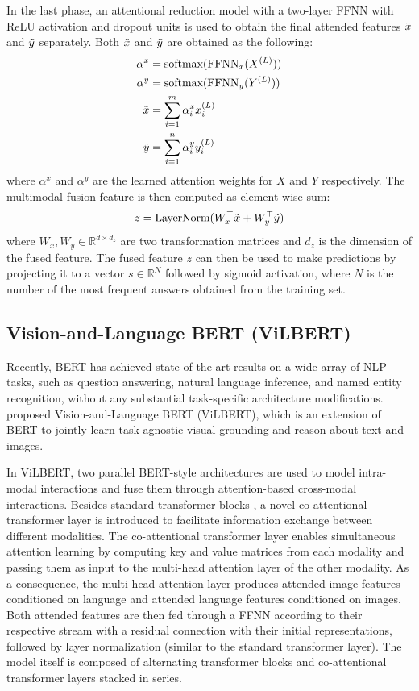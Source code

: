 \documentclass{article}
\begin{document}
In the last phase, an attentional reduction model with a two-layer FFNN with ReLU activation and dropout units is used to obtain the final attended features $\Tilde{x}$ and $\Tilde{y}$ separately. Both $\Tilde{x}$ and $\Tilde{y}$ are obtained as the following:
\begin{align}
    \alpha^{x} &= \text{softmax}(\text{FFNN}_{x}(X^{(L)})) \\
    \alpha^{y} &= \text{softmax}(\text{FFNN}_{y}(Y^{(L)})) \\
    \Tilde{x} &= \sum_{i=1}^{m}\alpha^{x}_{i}x^{(L)}_{i}  \label{eq_mcan_att} \\ 
     \Tilde{y} &= \sum_{i=1}^{n}\alpha^{y}_{i}y^{(L)}_{i}
\end{align}
where $\alpha^{x}$ and $\alpha^{y}$ are the learned attention weights for $X$ and $Y$ respectively. The multimodal fusion feature is then computed as element-wise sum:
\begin{align}
    z = \text{LayerNorm}(W^{\top}_{x}\Tilde{x} + W^{\top}_{y}\Tilde{y})
\end{align}
where $W_{x}, W_{y} \in \mathbb{R}^{d \times d_{z}}$ are two transformation matrices and $d_{z}$ is the dimension of the fused feature. The fused feature $z$ can then be used to make predictions by projecting it to a vector $s \in \mathbb{R}^{N}$ followed by sigmoid activation, where $N$ is the number of the most frequent answers obtained from the training set.

\subsection{Vision-and-Language BERT (ViLBERT)} \label{subsection:vilbert}
Recently, BERT \citep{devlin-etal-2019-bert} has achieved state-of-the-art results on a wide array of NLP tasks, such as question answering, natural language inference, and named entity recognition, without any substantial task-specific architecture modifications. \citet{lu2019vilbert} proposed Vision-and-Language BERT (ViLBERT), which is an extension of BERT to jointly learn task-agnostic visual grounding and reason about text and images. 

In ViLBERT, two parallel BERT-style architectures are used to model intra-modal interactions and fuse them through attention-based cross-modal interactions. Besides standard transformer blocks \citep{transformers}, a novel co-attentional transformer layer is introduced to facilitate information exchange between different modalities. The co-attentional transformer layer enables simultaneous attention learning by computing key and value matrices from each modality and passing them as input to the multi-head attention layer of the other modality. As a consequence, the multi-head attention layer produces attended image features conditioned on language and attended language features conditioned on images. Both attended features are then fed through a FFNN according to their respective stream with a residual connection with their initial representations, followed by layer normalization (similar to the standard transformer layer). The model itself is composed of alternating transformer blocks and co-attentional transformer layers stacked in series. 
\end{document}
